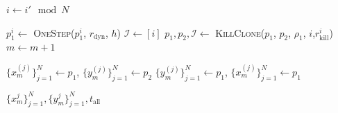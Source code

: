 \documentclass[english,11pt]{article}%
\numberwithin{equation}{section}
\numberwithin{example}{section}
\numberwithin{theorem}{section}
\begin{document}
\begin{algorithm}
\begin{algorithmic}[1]
    \State $i \gets i' \mod N$

        \State $p_1^{i} \gets$ \textsc{OneStep}($p_1^{i}$, $r_{\text{dyn}}$, $h$)
        \State $\mathcal{I} \gets [i]$
    \Else
        \State $p_1, p_2, \mathcal{I} \gets$ \textsc{KillClone}($p_1$, $p_2$,  $\rho_1$, $i$,$r_{\text{kill}}^{i}$)
    \EndIf
    \State $m \gets m+1$

        \State $\{ x_m^{(j)} \}_{j = 1}^N \gets p_1$, $\{y_m^{(j)} \}_{j = 1}^N \gets p_2$
    \Else
        \State $\{y_m^{(j)} \}_{j = 1}^N\gets p_1$,  $\{ x_m^{(j)} \}_{j = 1}^N\gets p_1$
    \EndIf

\EndWhile

\State \Return $\{x_m^j \}_{j = 1}^N, \{y_m^j \}_{j = 1}^N, t_{\text{all}}$

\EndFunction

\end{algorithmic}
\label{alg:FVINS}
\end{algorithm}





\newpage



\end{document}
